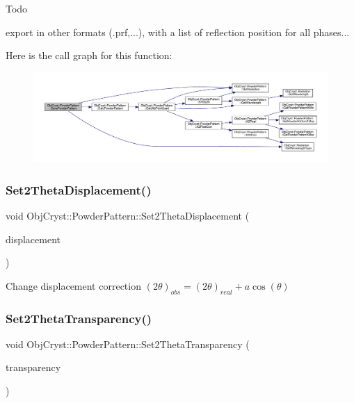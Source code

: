 \begin{DoxyRefDesc}{Todo}
\item[\mbox{\hyperlink{todo__todo000006}{Todo}}]export in other formats (.prf,...), with a list of reflection position for all phases... \end{DoxyRefDesc}
Here is the call graph for this function\+:
\nopagebreak
\begin{figure}[H]
\begin{center}
\leavevmode
\includegraphics[width=350pt]{class_obj_cryst_1_1_powder_pattern_ae9646ceed205b350e0dfa8f1bc5c3e17_cgraph}
\end{center}
\end{figure}
\mbox{\label{class_obj_cryst_1_1_powder_pattern_aee018af94fbc876762ccd98b0c8cb982}} 
\subsubsection{\texorpdfstring{Set2ThetaDisplacement()}{Set2ThetaDisplacement()}}
{\footnotesize\ttfamily void Obj\+Cryst\+::\+Powder\+Pattern\+::\+Set2\+Theta\+Displacement (\begin{DoxyParamCaption}\item[{const R\+E\+AL}]{displacement }\end{DoxyParamCaption})}

Change displacement correction $ (2\theta)_{obs} = (2\theta)_{real} + a\cos(\theta) $ \mbox{\label{class_obj_cryst_1_1_powder_pattern_a7520df007f0e2058201c81f6bf6122ff}} 
\subsubsection{\texorpdfstring{Set2ThetaTransparency()}{Set2ThetaTransparency()}}
{\footnotesize\ttfamily void Obj\+Cryst\+::\+Powder\+Pattern\+::\+Set2\+Theta\+Transparency (\begin{DoxyParamCaption}\item[{const R\+E\+AL}]{transparency }\end{DoxyParamCaption})}

